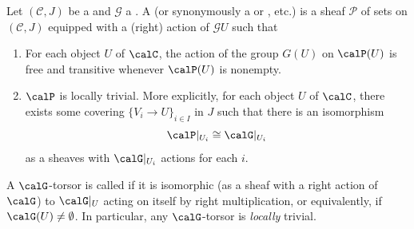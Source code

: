 \begin{definition} \label{definition:torsor_principal_homogeneous_space_of_a_sheaf_of_groups_on_a_site_over_an_object}
    Let $(\mathcal{C},J)$ be a  and $\mathcal{G}$ a . A  (or synonymously a  or , etc.) is a sheaf $\mathcal{P}$ of sets on $(\mathcal{C},J)$ equipped with a (right) action of $\mathcal{G}U$ such that 
    \begin{enumerate}
        \item For each object $U$ of $\calC$, the action of the group $G(U)$ on $\calP(U)$ is free and transitive whenever $\calP(U)$ is nonempty.

        \item $\calP$ is locally trivial. More explicitly, for each object $U$ of $\calC$, there exists some covering $\{V_i \to U\}_{i \in I}$ in $J$ such that there is an isomorphism 
        $$\calP|_{U_i} \cong \calG|_{U_i}$$
         as a sheaves with $\calG|_{U_i}$ actions for each $i$.
        
    \end{enumerate}
    A $\calG$-torsor is called  if it is isomorphic (as a sheaf with a right action of $\calG$) to $\calG|_U$ acting on itself by right multiplication, or equivalently, if $\calG(U) \neq \emptyset$. In particular, any $\calG$-torsor is \emph{locally} trivial.

\end{definition}